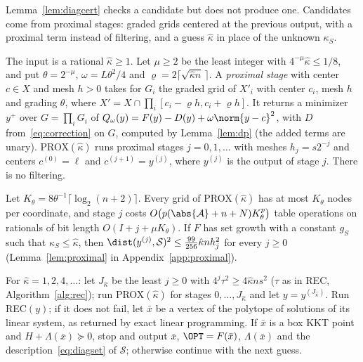 Lemma~\ref{lem:diagcert} checks a candidate but does not produce one.
Candidates come from proximal stages: graded grids centered at the previous
output, with a proximal term instead of filtering, and a guess $\hat\kappa$
in place of the unknown $\kappa_S$.

\begin{algorithm}\label{alg:prox}
The input is a rational $\hat\kappa\ge1$. Let $\mu\ge2$ be the least integer
with $4^{-\mu}\hat\kappa\le1/8$, and put $\theta=2^{-\mu}$,
$\omega=L\theta^2/4$ and $\varrho=2\lceil\sqrt{\hat\kappa n}\,\rceil$. A
\emph{proximal stage} with center $c\in X$ and mesh $h>0$ takes for $G_i$ the
graded grid of $X'_i$ with center $c_i$, mesh $h$ and grading $\theta$, where
$X'=X\cap\prod_i[c_i-\varrho h,c_i+\varrho h]$. It returns a minimizer $y^+$
over $G=\prod_iG_i$ of $Q_\omega(y)=F(y)-D(y)+\omega\norm{y-c}^2$, with $D$
from~\eqref{eq:correction} on $G$, computed by Lemma~\ref{lem:dp} (the added
terms are unary). PROX$(\hat\kappa)$ runs proximal stages $j=0,1,\dots$ with
meshes $h_j=s2^{-j}$ and centers $c^{(0)}=\ell$ and $c^{(j+1)}=y^{(j)}$,
where $y^{(j)}$ is the output of stage $j$. There is no filtering.
\end{algorithm}

Let $K_\theta=8\theta^{-1}\lceil\log_2(n+2)\rceil$. Every grid of
PROX$(\hat\kappa)$ has at most $K_\theta$ nodes per coordinate, and stage $j$
costs $O\bigl(p(\abs{\mathcal A}+n+N)K_\theta^p\bigr)$ table operations on
rationals of bit length $O(I+j+\mu K_\theta)$. If $F$ has set growth with a
constant $g_S$ such that $\kappa_S\le\hat\kappa$, then
$\dist(y^{(j)},\mathcal S)^2\le\frac{99}{256}\hat\kappa nh_j^2$ for every
$j\ge0$ (Lemma~\ref{lem:proximal} in Appendix~\ref{app:proximal}).

\begin{algorithm}\label{alg:disc}
For $\hat\kappa=1,2,4,\dots$: let $J_{\hat\kappa}$ be the least $j\ge0$ with
$4^j\tau^2\ge4\hat\kappa ns^2$ ($\tau$ as in REC, Algorithm~\ref{alg:rec});
run PROX$(\hat\kappa)$ for stages $0,\dots,J_{\hat\kappa}$ and let
$y=y^{(J_{\hat\kappa})}$. Run REC$(y)$; if it does not fail, let $\bar x$ be
a vertex of the polytope of solutions of its linear system, as returned by
exact linear programming. If $\bar x$ is a box KKT point and
$H+\Lambda(\bar x)\succeq0$, stop and output $\bar x$, $\OPT=F(\bar x)$,
$\Lambda(\bar x)$ and the description~\eqref{eq:diagset} of $\mathcal S$;
otherwise continue with the next guess.
\end{algorithm}

